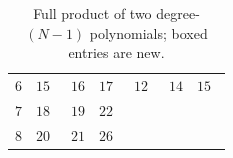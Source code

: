 \documentclass[11pt]{article}
\theoremstyle{definition}
\begin{document}
\begin{table}[!ht]
\begin{tabular}{lllllll}
    $6$ & $15$~\cite{lempel1977new,brockett1978optimal,grassl2007codetables} & $\boxed{16}$                    & $17$~\cite{montgomery2005five}               & $12$~\cite{lempel1977new,brockett1978optimal,solomon1965algebraically}   & $\boxed{14}$ & $15$~\cite{barbulescu2012finding}           \\
    $7$ & $18$~\cite{lempel1977new,brockett1978optimal,grassl2007codetables} & $\boxed{19}$                    & $22$~\cite{montgomery2005five}               &                                                                              &              &                                        \\
    $8$ & $20$~\cite{lempel1977new,brockett1978optimal,grassl2007codetables} & $\boxed{21}$                    & $26$~\cite{fan2007comments} &                                                                              &              &                                        \\
    \bottomrule
  \end{tabular}
  \caption{Full product of two degree-$(N-1)$ polynomials; boxed entries are new.}
  \label{tab:full}
\end{table}
\end{document}
